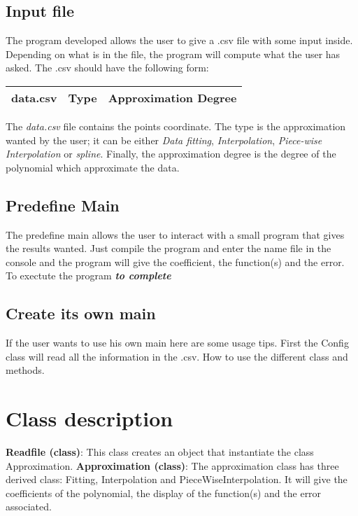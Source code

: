 \documentclass[12pt]{article}
\begin{document}
\subsection{Input file}
The program developed allows the user to give a .csv file with some input inside. Depending on what is in the file, the program will compute what the user has asked. The .csv should have the following form:\\
\begin{center}
\begin{tabular}{|c|c|c|}
\hline
data.csv  & Type & Approximation Degree \\
\hline
\end{tabular} 
\end{center}
The \emph{data.csv} file contains the points coordinate. The type is the approximation wanted by the user; it can be either \emph{Data fitting}, \emph{Interpolation}, \emph{Piece-wise Interpolation} or \emph{spline}. Finally, the approximation degree  is the degree of the polynomial which approximate the data.\\

\subsection{Predefine Main}
The predefine main allows the user to interact with a small program that gives the results wanted. Just compile the program and enter the name file in the console and the program will give the coefficient, the function(s) and the error.
To exectute the program \textbf{\emph{to complete}}

\subsection{Create its own main}
If the user wants to use his own main here are some usage tips. First the Config class will read all the information in the .csv. 
How to use the different class and methods.

\section{Class description}
\textbf{Readfile (class)}: This class creates an object that instantiate the class Approximation.
\textbf{Approximation (class)}: The approximation class has three derived class: Fitting, Interpolation and PieceWiseInterpolation. It will give the coefficients of the polynomial, the display of the function(s) and the error associated.
\end{document}
